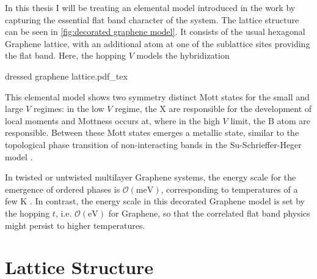 \documentclass[../notes.tex]{subfiles}
\begin{document}
In this thesis I will be treating an elemental model introduced in the work by \citeauthor{wittQuantumGeometryLocal2025} capturing the essential flat band character of the system.
The lattice structure can be seen in \cref{fig:decorated graphene model}.
It consists of the usual hexagonal Graphene lattice, with an additional atom at one of the sublattice sites providing the flat band.
Here, the hopping \(V\) models the hybridization 
\begin{SCfigure}[50][t]
	\centering
	{dressed graphene lattice.pdf_tex}
	\caption{\textbf{Lattice structure of decorated graphene honeycomb lattice.} with impurity X hybridized to sublattice site A. Only hopping t between sublattices A and B as well as V between X and A exist. Created using VESTA \cite{mommaVESTA3Threedimensional2011}.}
	\label{fig:decorated graphene model}
\end{SCfigure}

This elemental model shows two symmetry distinct Mott states for the small and large \(V\) regimes: in the low \(V\) regime, the \(\mathrm{X}\) are responsible for the development of local moments and Mottness occurs at, where in the high \(V\) limit, the \(\mathrm{B}\) atom are responsible.
Between these Mott states emerges a metallic state, similar to the topological phase transition of non-interacting bands in the Su-Schrieffer-Heger model \cite{suSolitonExcitationsPolyacetylene1980}.

In twisted or untwisted multilayer Graphene systems, the energy scale for the emergence of ordered phases is \(\mathcal{O} (\unit{\milli\electronvolt})\), corresponding to temperatures of a few \unit{\kelvin} \cite{nuckollsMicroscopicPerspectiveMoire2024, pantaleonSuperconductivityCorrelatedPhases2023a}.
In contrast, the energy scale in this decorated Graphene model is set by the hopping \(t\), i.e. \(\mathcal{O} (\unit{\electronvolt})\) for Graphene, so that the correlated flat band physics might persist to higher temperatures.

\section{Lattice Structure}\label{sec:lattice and band structure}
\end{document}
